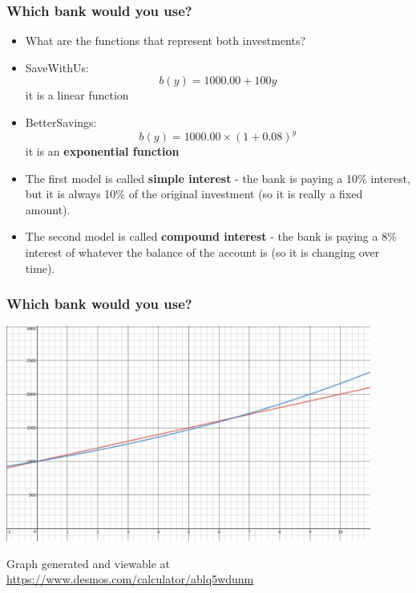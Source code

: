 \documentclass[notheorems
          ]
          {beamer}
\begin{document}
\begin{frame}
 \frametitle { Which bank would you use? }

 
 \begin{itemize}
  \item  What are the functions that represent both investments? 
  \item  SaveWithUs: $$b(y) = 1000.00 + 100y $$  it is a linear function  
  \item  BetterSavings: $$b(y) = 1000.00 \times (1+0.08)^y$$ it is an \textbf{exponential function} 
  \item  The first model is called \textbf{simple interest} - the bank is paying a 10\% interest, but it is always 
     10\% of the original investment (so it is really a fixed amount). 
  \item The second model is called \textbf{compound interest}  - the bank is paying a 8\% interest of whatever the 
  balance of the account is (so it is changing over time). 
  
 \end{itemize}

\end{frame}

\begin{frame}
 \frametitle { Which bank would you use? }
 
 \begin{center}
 \includegraphics[width=0.9\textwidth]{img/interest_1.png}
\end{center}

Graph generated and viewable at \url{https://www.desmos.com/calculator/ablq5wdunm} 
 
\end{frame}
\end{document}
